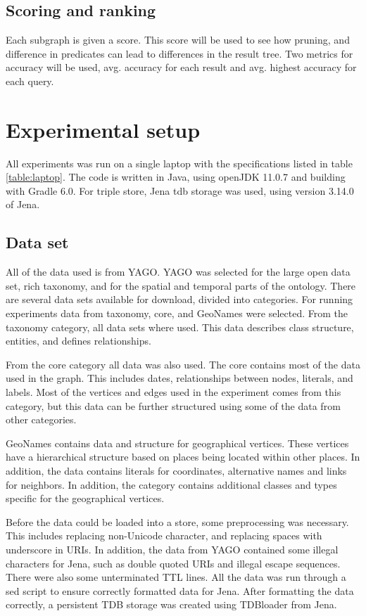 \subsection{Scoring and ranking}
Each subgraph is given a score. This score will be used to see how pruning, and difference in predicates can lead to differences in the result tree. Two metrics for accuracy will be used, avg. accuracy for each result and avg. highest accuracy for each query.

\section{Experimental setup}
\label{sec:experimentalSetup}
All experiments was run on a single laptop with the specifications listed in table \ref{table:laptop}. The code is written in Java, using openJDK 11.0.7 and building with Gradle 6.0. For triple store, Jena tdb storage was used, using version 3.14.0 of Jena.


\subsection{Data set}
All of the data used is from YAGO. YAGO was selected for the large open data set, rich taxonomy, and for the spatial and temporal parts of the ontology. There are several data sets available for download, divided into categories. For running experiments data from taxonomy, core, and GeoNames were selected. From the taxonomy category, all data sets where used. This data describes class structure, entities, and defines relationships.

From the core category all data was also used. The core contains most of the data used in the graph. This includes dates, relationships between nodes, literals, and labels. Most of the vertices and edges used in the experiment comes from this category, but this data can be further structured using some of the data from other categories.

GeoNames contains data and structure for geographical vertices. These vertices have a hierarchical structure based on places being located within other places. In addition, the data contains literals for coordinates, alternative names and links for neighbors. In addition, the category contains additional classes and types specific for the geographical vertices.

Before the data could be loaded into a store, some preprocessing was necessary. This includes replacing non-Unicode character, and replacing spaces with underscore in URIs. In addition, the data from YAGO contained some illegal characters for Jena, such as double quoted URIs and illegal escape sequences. There were also some unterminated TTL lines. All the data was run through a sed script to ensure correctly formatted data for Jena. After formatting the data correctly, a persistent TDB storage was created using TDBloader from Jena.

